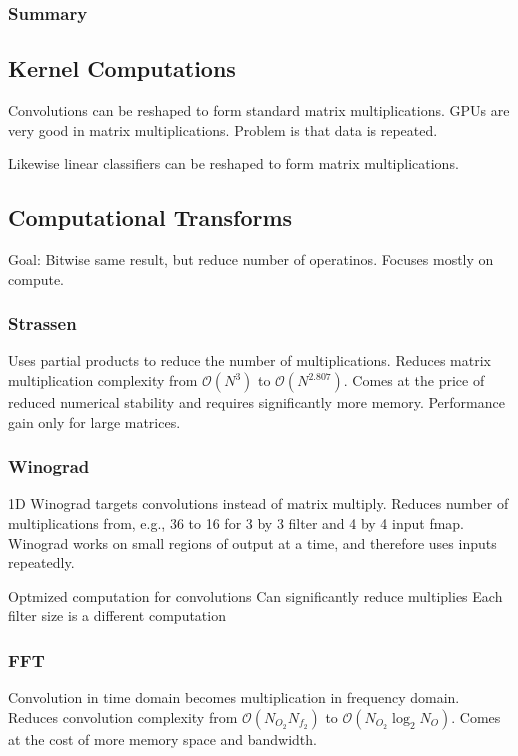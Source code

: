 \documentclass[a4paper, fontsize=8pt, landscape, DIV=1]{scrartcl}
\begin{document}
\begin{multicols*}{4}
  \subsubsection{Summary}

  \subsection{Kernel Computations}
  Convolutions can be reshaped to form standard matrix multiplications. GPUs are 
  very good in matrix multiplications. Problem is that data is repeated.

  Likewise linear classifiers can be reshaped to form matrix multiplications.

  \subsection{Computational Transforms}
  Goal: Bitwise same result, but reduce number of operatinos. Focuses
  mostly on compute.

  \subsubsection{Strassen}
  Uses partial products to reduce the number of multiplications. Reduces matrix 
  multiplication complexity from $\mathcal{O}(N^3)$ to $\mathcal{O}(N^{2.807})$. Comes at the
  price of reduced numerical stability and requires significantly more memory. 
  Performance gain only for large matrices.

  \subsubsection{Winograd}
  1D Winograd targets convolutions instead of matrix multiply. Reduces number of multiplications
  from, e.g., 36 to 16 for 3 by 3 filter and 4 by 4 input fmap. Winograd works on small regions
  of output at a time, and therefore uses inputs repeatedly.
  \begin{outline}
    \1 Optmized computation for convolutions
    \1 Can significantly reduce multiplies
    \1 Each filter size is a different computation
  \end{outline}

  \subsubsection{FFT}
  Convolution in time domain becomes multiplication in frequency domain. Reduces convolution
  complexity from $\mathcal{O}(N_{O_2}N_{f_2})$ to $\mathcal{O}(N_{O_2}\log_2N_{O})$. Comes
  at the cost of more memory space and bandwidth.


\end{multicols*}
\end{document}
